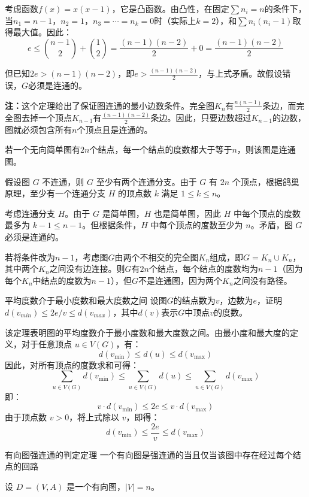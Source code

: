 \documentclass[lang=cn,11pt]{elegantbook}
\begin{document}
考虑函数$f(x) = x(x-1)$，它是凸函数。由凸性，在固定$\sum n_i = n$的条件下，当$n_1 = n-1$，$n_2 = 1$，$n_3 = \cdots = n_k = 0$时（实际上$k=2$），和$\sum n_i(n_i-1)$取得最大值。因此：
\[
e \leqslant \binom{n-1}{2} + \binom{1}{2} = \frac{(n-1)(n-2)}{2} + 0 = \frac{(n-1)(n-2)}{2}
\]

但已知$2e > (n-1)(n-2)$，即$e > \frac{(n-1)(n-2)}{2}$，与上式矛盾。故假设错误，$G$必须是连通的。

\textbf{注：}这个定理给出了保证图连通的最小边数条件。完全图$K_n$有$\frac{n(n-1)}{2}$条边，而完全图去掉一个顶点$K_{n-1}$有$\frac{(n-1)(n-2)}{2}$条边。因此，只要边数超过$K_{n-1}$的边数，图就必须包含所有$n$个顶点且是连通的。
\begin{example}
    若一个无向简单图有$2n$个结点，每一个结点的度数都大于等于$n$，则该图是连通图。
\end{example}
假设图 $G$ 不连通，则 $G$ 至少有两个连通分支。由于 $G$ 有 $2n$ 个顶点，根据鸽巢原理，至少有一个连通分支 $H$ 的顶点数 $k$ 满足 $1 \leqslant k \leqslant n$。
    
考虑连通分支 $H$。由于 $G$ 是简单图，$H$ 也是简单图，因此 $H$ 中每个顶点的度数最多为 $k-1\leqslant n-1$。但根据条件，$H$ 中每个顶点的度数至少为 $n$。矛盾，图 $G$ 必须是连通的。

若将条件改为$n-1$，考虑图$G$由两个不相交的完全图$K_n$组成，即$G = K_n \cup K_n$，其中两个$K_n$之间没有边连接。则$G$有$2n$个结点，每个结点的度数均为$n-1$（因为每个$K_n$中结点的度数为$n-1$），但$G$不是连通图，因为两个$K_n$之间没有路径。
\begin{theorem}{平均度数介于最小度数和最大度数之间}
    设图$G$的结点数为$v$，边数为$e$，证明$d(v_{min})\leqslant 2e/v\leqslant d(v_{max})$，其中$d(v)$表示$G$中顶点$v$的度数。
\end{theorem}
该定理表明图的平均度数介于最小度数和最大度数之间。由最小度和最大度的定义，对于任意顶点 $u \in V(G)$，有：
    \[
    d(v_{\text{min}}) \leqslant d(u) \leqslant d(v_{\text{max}})
    \]
    因此，对所有顶点的度数求和可得：
    \[
    \sum_{u \in V(G)} d(v_{\text{min}}) \leqslant \sum_{u \in V(G)} d(u) \leqslant \sum_{u \in V(G)} d(v_{\text{max}})
    \]
    即：
    \[
    v \cdot d(v_{\text{min}}) \leqslant 2e \leqslant v \cdot d(v_{\text{max}})
    \]
    由于顶点数 $v > 0$，将上式除以 $v$，即得：
    \[
    d(v_{\text{min}}) \leqslant \frac{2e}{v} \leqslant d(v_{\text{max}})
    \]
\begin{theorem}{有向图强连通的判定定理}
    一个有向图是强连通的当且仅当该图中存在经过每个结点的回路
\end{theorem}
设 $D = (V, A)$ 是一个有向图，$|V| = n$。
\end{document}
